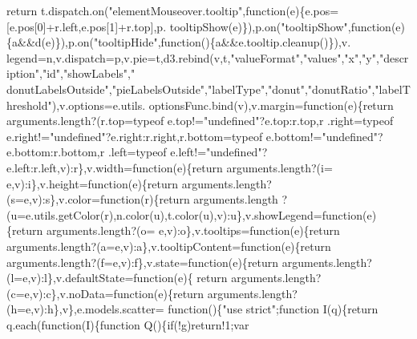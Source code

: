 \begin{DoxyCode}
{      return} t.dispatch.on(\textcolor{stringliteral}{"elementMouseover.tooltip"},\textcolor{keyword}{function}(e)\{e.pos=[e.pos[0]+r.left,e.pos[1]+r.top],p.
      tooltipShow(e)\}),p.on(\textcolor{stringliteral}{"tooltipShow"},\textcolor{keyword}{function}(e)\{a&&d(e)\}),p.on(\textcolor{stringliteral}{"tooltipHide"},\textcolor{keyword}{function}()\{a&&e.tooltip.cleanup()\}),v.
      legend=n,v.dispatch=p,v.pie=t,d3.rebind(v,t,\textcolor{stringliteral}{"valueFormat"},\textcolor{stringliteral}{"values"},\textcolor{stringliteral}{"x"},\textcolor{stringliteral}{"y"},\textcolor{stringliteral}{"description"},\textcolor{stringliteral}{"id"},\textcolor{stringliteral}{"showLabels"},\textcolor{stringliteral}{"
      donutLabelsOutside"},\textcolor{stringliteral}{"pieLabelsOutside"},\textcolor{stringliteral}{"labelType"},\textcolor{stringliteral}{"donut"},\textcolor{stringliteral}{"donutRatio"},\textcolor{stringliteral}{"labelThreshold"}),v.options=e.utils.
      optionsFunc.bind(v),v.margin=\textcolor{keyword}{function}(e)\{\textcolor{keywordflow}{return} arguments.length?(r.top=typeof e.top!=\textcolor{stringliteral}{"undefined"}?e.top:r.top,r
      .right=typeof e.right!=\textcolor{stringliteral}{"undefined"}?e.right:r.right,r.bottom=typeof e.bottom!=\textcolor{stringliteral}{"undefined"}?e.bottom:r.bottom,r
      .left=typeof e.left!=\textcolor{stringliteral}{"undefined"}?e.left:r.left,v):r\},v.width=\textcolor{keyword}{function}(e)\{\textcolor{keywordflow}{return} arguments.length?(i=
      e,v):i\},v.height=\textcolor{keyword}{function}(e)\{\textcolor{keywordflow}{return} arguments.length?(s=e,v):s\},v.color=\textcolor{keyword}{function}(r)\{\textcolor{keywordflow}{return} arguments.length
      ?(u=e.utils.getColor(r),n.color(u),t.color(u),v):u\},v.showLegend=\textcolor{keyword}{function}(e)\{\textcolor{keywordflow}{return} arguments.length?(o=
      e,v):o\},v.tooltips=\textcolor{keyword}{function}(e)\{\textcolor{keywordflow}{return} arguments.length?(a=e,v):a\},v.tooltipContent=\textcolor{keyword}{function}(e)\{\textcolor{keywordflow}{return} 
      arguments.length?(f=e,v):f\},v.state=\textcolor{keyword}{function}(e)\{\textcolor{keywordflow}{return} arguments.length?(l=e,v):l\},v.defaultState=\textcolor{keyword}{function}(e)\{\textcolor{keywordflow}{
      return} arguments.length?(c=e,v):c\},v.noData=\textcolor{keyword}{function}(e)\{\textcolor{keywordflow}{return} arguments.length?(h=e,v):h\},v\},e.models.scatter=\textcolor{keyword}{
      function}()\{\textcolor{stringliteral}{"use strict"};\textcolor{keyword}{function} I(q)\{\textcolor{keywordflow}{return} q.each(\textcolor{keyword}{function}(I)\{\textcolor{keyword}{function} Q()\{\textcolor{keywordflow}{if}(!g)\textcolor{keywordflow}{return}!1;var 

\end{DoxyCode}
